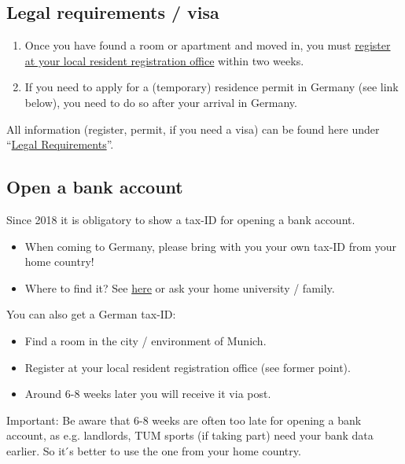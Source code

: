 \subsection{Legal requirements / visa}
\begin{enumerate}
  \item Once you have found a room or apartment and moved in, you must \href{https://www.muenchen.de/rathaus/home_en/Department-of-Public-Order/Registration-Deregistration}{register at your local resident
  registration office} within two weeks.
  \item If you need to apply for a (temporary) residence permit in Germany (see link below), you need to do so
  after your arrival in Germany.
\end{enumerate}
All information (register, permit, if you need a visa) can be found here under “\href{http://www.international.tum.de/en/exchangestudents/}{Legal Requirements}”.


\subsection{Open a bank account}
Since 2018 it is obligatory to show a tax-ID for opening a bank account.
\begin{itemize}
  \item When coming to Germany, please bring with you your own tax-ID from your home country!
  \item Where to find it? See \href{http://www.oecd.org/tax/automatic-exchange/crs-implementation-and-assistance/tax-identification-numbers/}{here} or ask your home university / family.
\end{itemize}
You can also get a German tax-ID:
\begin{itemize}
  \item Find a room in the city / environment of Munich.
  \item Register at your local resident registration office (see former point).
  \item Around 6-8 weeks later you will receive it via post.
  
\end{itemize}
Important: Be aware that 6-8 weeks are often too late for opening a bank account, as e.g. landlords, TUM
sports (if taking part) need your bank data earlier. So it ́s better to use the one from your home country.

